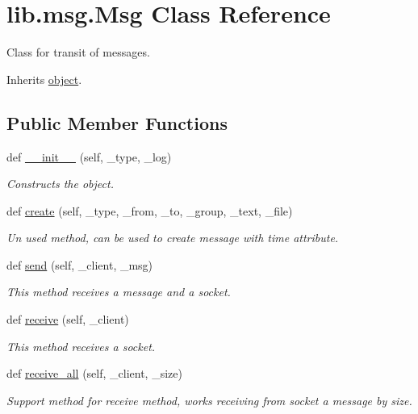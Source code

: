 \hypertarget{classlib_1_1msg_1_1_msg}{}\section{lib.\+msg.\+Msg Class Reference}
\label{classlib_1_1msg_1_1_msg}


Class for transit of messages.  




Inherits \hyperlink{classobject}{object}.

\subsection*{Public Member Functions}
\begin{DoxyCompactItemize}
\item 
def \hyperlink{classlib_1_1msg_1_1_msg_a940ef0ccfa2f4a4af1fa33860cb1c6fa}{\+\_\+\+\_\+init\+\_\+\+\_\+} (self, \+\_\+type, \+\_\+log)
\begin{DoxyCompactList}\small\item\em Constructs the object. \end{DoxyCompactList}\item 
def \hyperlink{classlib_1_1msg_1_1_msg_a4b749e97fce265348bc7e57b8d2aaa68}{create} (self, \+\_\+type, \+\_\+from, \+\_\+to, \+\_\+group, \+\_\+text, \+\_\+file)
\begin{DoxyCompactList}\small\item\em Un used method, can be used to create message with time attribute. \end{DoxyCompactList}\item 
def \hyperlink{classlib_1_1msg_1_1_msg_a5460a048522d65966fb8def589c1edc9}{send} (self, \+\_\+client, \+\_\+msg)
\begin{DoxyCompactList}\small\item\em This method receives a message and a socket. \end{DoxyCompactList}\item 
def \hyperlink{classlib_1_1msg_1_1_msg_a8bf1ba01d1b81ccfa2331f3888507974}{receive} (self, \+\_\+client)
\begin{DoxyCompactList}\small\item\em This method receives a socket. \end{DoxyCompactList}\item 
def \hyperlink{classlib_1_1msg_1_1_msg_addaf9d525e67a6ccbc9043232b8918ba}{receive\+\_\+all} (self, \+\_\+client, \+\_\+size)
\begin{DoxyCompactList}\small\item\em Support method for \textquotesingle{}receive\textquotesingle{} method, works receiving from socket a message by size. \end{DoxyCompactList}\end{DoxyCompactItemize}
